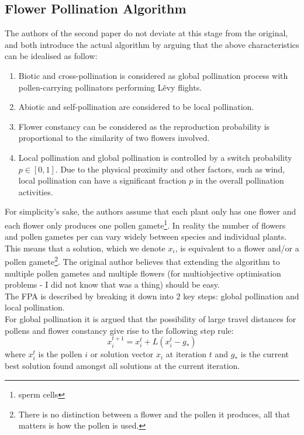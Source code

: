 \subsection{Flower Pollination Algorithm}

The authors of the second paper do not deviate at this stage from the original, and both introduce the actual algorithm by arguing that the above characteristics can be idealised as follow:
\begin{enumerate}[1.]
\item Biotic and cross-pollination is considered as global pollination process with pollen-carrying pollinators performing L\~evy flights.
\item Abiotic and self-pollination are considered to be local pollination.
\item Flower constancy can be considered as the reproduction probability is proportional to the similarity of two flowers involved.
\item Local pollination and global pollination is controlled by a switch probability $p \in [0,1]$. Due to the physical proximity and other factors, such as wind, local pollination can have a significant fraction $p$ in the overall pollination activities.
\end{enumerate}
For simplicity's sake, the authors assume that each plant only has one flower and each flower only produces one pollen gamete\footnote{sperm cells}. In reality the number of flowers and pollen gametes per can vary widely between species and individual plants. This means that a solution, which we denote $x_i$, is equivalent to a flower and/or a pollen gamete\footnote{There is no distinction between a flower and the pollen it produces, all that matters is how the pollen is used.}. The original author believes that extending the algorithm to multiple pollen gametes and multiple flowers (for multiobjective optimisation problems - I did not know that was a thing) should be easy.\\
The FPA is described by breaking it down into 2 key steps: global pollination and local pollination.\\
For global pollination it is argued that the possibility of large travel distances for pollens and flower constancy give rise to the following step rule:
\begin{equation}
x_i^{t+1} = x_i^{t} + L(x_i^{t} - g_*)
\end{equation}
where $x_i^{t}$ is the pollen $i$ or solution vector $x_i$ at iteration $t$ and $g_*$ is the current best solution found amongst all solutions at the current iteration. \\
